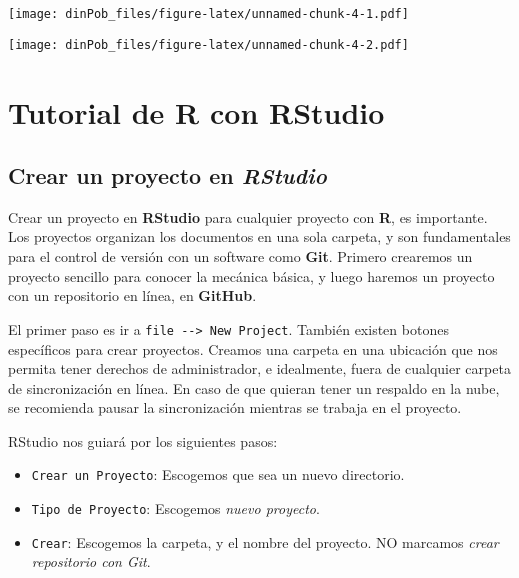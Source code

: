 \documentclass[12pt,letterpaper,]{book}
\newenvironment{Shaded}{\begin{snugshade}}{\end{snugshade}}
\newcommand{\KeywordTok}[1]{\textcolor[rgb]{0.13,0.29,0.53}{\textbf{#1}}}
\newcommand{\DataTypeTok}[1]{\textcolor[rgb]{0.13,0.29,0.53}{#1}}
\newcommand{\StringTok}[1]{\textcolor[rgb]{0.31,0.60,0.02}{#1}}
\newcommand{\OperatorTok}[1]{\textcolor[rgb]{0.81,0.36,0.00}{\textbf{#1}}}
\newcommand{\NormalTok}[1]{#1}
\begin{document}
\texttt{[image: dinPob\_files/figure-latex/unnamed-chunk-4-1.pdf]}

\begin{Shaded}
\end{Shaded}

\texttt{[image: dinPob\_files/figure-latex/unnamed-chunk-4-2.pdf]}

\chapter{Tutorial de R con RStudio}\label{tutorial-de-r-con-rstudio}

\section{\texorpdfstring{Crear un proyecto en
\emph{RStudio}}{Crear un proyecto en RStudio}}\label{crear-un-proyecto-en-rstudio}

Crear un proyecto en \textbf{RStudio} para cualquier proyecto con
\textbf{R}, es importante. Los proyectos organizan los documentos en una
sola carpeta, y son fundamentales para el control de versión con un
software como \textbf{Git}. Primero crearemos un proyecto sencillo para
conocer la mecánica básica, y luego haremos un proyecto con un
repositorio en línea, en \textbf{GitHub}.

El primer paso es ir a \texttt{file\ -\/-\textgreater{}\ New\ Project}.
También existen botones específicos para crear proyectos. Creamos una
carpeta en una ubicación que nos permita tener derechos de
administrador, e idealmente, fuera de cualquier carpeta de
sincronización en línea. En caso de que quieran tener un respaldo en la
nube, se recomienda pausar la sincronización mientras se trabaja en el
proyecto.

RStudio nos guiará por los siguientes pasos:

\begin{itemize}
\item
  \texttt{Crear\ un\ Proyecto}: Escogemos que sea un nuevo directorio.
\item
  \texttt{Tipo\ de\ Proyecto}: Escogemos \emph{nuevo proyecto}.
\item
  \texttt{Crear}: Escogemos la carpeta, y el nombre del proyecto. NO
  marcamos \emph{crear repositorio con Git}.
\end{itemize}
\end{document}
